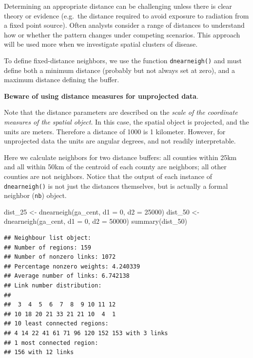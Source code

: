 \documentclass[
]{book}
\newenvironment{Shaded}{\begin{snugshade}}{\end{snugshade}}
\newcommand{\AttributeTok}[1]{\textcolor[rgb]{0.77,0.63,0.00}{#1}}
\newcommand{\DecValTok}[1]{\textcolor[rgb]{0.00,0.00,0.81}{#1}}
\newcommand{\FunctionTok}[1]{\textcolor[rgb]{0.00,0.00,0.00}{#1}}
\newcommand{\NormalTok}[1]{#1}
\newcommand{\OtherTok}[1]{\textcolor[rgb]{0.56,0.35,0.01}{#1}}
\newenvironment{rmdcaution}[1]
  {
  \begin{itemize}
  \renewcommand{\labelitemi}{
    \raisebox{-.7\height}[0pt][0pt]{
      {\setkeys{Gin}{width=3em,keepaspectratio}\texttt{[image: images/\#1]}}
    }
  }
  \setlength{\fboxsep}{1em}
  \begin{caution}
  \item
  }
  {
  \end{caution}
  \end{itemize}
  }
\begin{document}
Determining an appropriate distance can be challenging unless there is clear theory or evidence (e.g.~the distance required to avoid exposure to radiation from a fixed point source). Often analysts consider a range of distances to understand how or whether the pattern changes under competing scenarios. This approach will be used more when we investigate spatial clusters of disease.

To define fixed-distance neighbors, we use the function \texttt{dnearneigh()} and must define both a minimum distance (probably but not always set at zero), and a maximum distance defining the buffer.

\begin{rmdcaution}{caution}
\textbf{Beware of using distance measures for unprojected data}.

Note that the distance parameters are described on the \emph{scale of the coordinate measures of the spatial object}. In this case, the spatial object is projected, and the units are meters. Therefore a distance of 1000 is 1 kilometer. However, for unprojected data the units are angular degrees, and not readily interpretable.

\end{rmdcaution}

Here we calculate neighbors for two distance buffers: all counties within 25km and all within 50km of the centroid of each county are neighbors; all other counties are not neighbors. Notice that the output of each instance of \texttt{dnearneigh()} is not just the distances themselves, but is actually a formal neighbor (\texttt{nb}) object.

\begin{Shaded}
\begin{Highlighting}[]
\NormalTok{dist\_25 }\OtherTok{\textless{}{-}} \FunctionTok{dnearneigh}\NormalTok{(ga\_cent, }\AttributeTok{d1 =} \DecValTok{0}\NormalTok{, }\AttributeTok{d2 =} \DecValTok{25000}\NormalTok{)}
\NormalTok{dist\_50 }\OtherTok{\textless{}{-}} \FunctionTok{dnearneigh}\NormalTok{(ga\_cent, }\AttributeTok{d1 =} \DecValTok{0}\NormalTok{, }\AttributeTok{d2 =} \DecValTok{50000}\NormalTok{)}
\FunctionTok{summary}\NormalTok{(dist\_50)}
\end{Highlighting}
\end{Shaded}

\begin{verbatim}
## Neighbour list object:
## Number of regions: 159 
## Number of nonzero links: 1072 
## Percentage nonzero weights: 4.240339 
## Average number of links: 6.742138 
## Link number distribution:
## 
##  3  4  5  6  7  8  9 10 11 12 
## 10 18 20 21 33 21 21 10  4  1 
## 10 least connected regions:
## 4 14 22 41 61 71 96 120 152 153 with 3 links
## 1 most connected region:
## 156 with 12 links
\end{verbatim}
\end{document}
